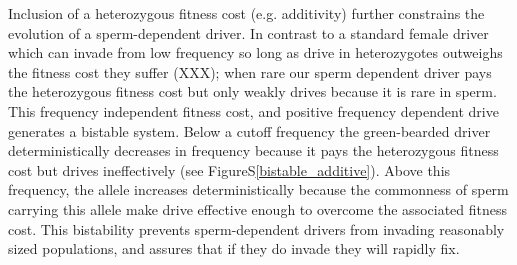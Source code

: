 \documentclass[12pt,letterpaper]{article}
\begin{document}

Inclusion of a heterozygous fitness cost (e.g. additivity) further constrains the evolution of a sperm-dependent driver. 
In contrast to a  standard female  driver which can invade from low frequency so long as drive in heterozygotes outweighs the fitness cost they suffer (XXX); 
	when rare our sperm dependent driver pays the heterozygous fitness cost but only weakly drives because it is rare in sperm. 
This frequency independent fitness cost, and positive frequency dependent drive generates a bistable system. 
Below a cutoff frequency the green-bearded driver deterministically decreases in frequency 
	because it pays the  heterozygous fitness cost  but drives ineffectively (see FigureS\ref{bistable_additive}). 
Above this frequency, the allele increases deterministically because the commonness of sperm carrying this allele 
	make drive effective enough to overcome the associated fitness cost.
This bistability prevents sperm-dependent drivers from invading 	
	reasonably sized populations, and assures that if they do invade they will rapidly fix.
\end{document}
